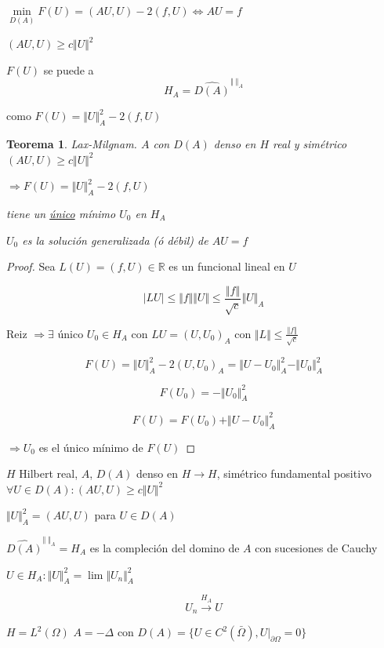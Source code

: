 \documentclass[a4paper,10pt]{book}
\newtheorem{theorem}{Teorema}
\begin{document}
 $\underset{D(A)}{\min} F(U)= (AU,U) -2 (f,U) \Leftrightarrow AU=f$ 

 $(AU,U) \geq c\Vert U\Vert^2$

 $F(U)$ se puede a 
 \[H_A = \widehat{D(A)}^{\Vert \;\Vert_A} \]

como $F(U)= \Vert U \Vert_A^2 -2 (f,U)$

\begin{theorem}
    Lax-Milgnam. $A$ con $D(A)$ denso en $H$ real y simétrico $(AU,U)\geq c \Vert U\Vert^2 $

    $\Rightarrow F(U)= \Vert U\Vert_A^2 -2(f,U)$

    tiene un \underline{único}  mínimo $U_0$ en $H_A$ 

    $U_0$ es la solución generalizada (ó débil) de $AU=f$    
\end{theorem}

\begin{proof}
    Sea $L(U)=(f,U) \in \mathbb{R}$ es un funcional lineal en $U$

    \[
    |LU| \leq \Vert f\Vert \Vert U \Vert \leq \frac{\Vert f\Vert}{\sqrt{c}} \Vert U\Vert_A
    \]

    Reiz $\Rightarrow \exists $ único $U_0\in H_A$ con $LU = (U,U_0)_A $ con $\Vert L\Vert \leq \frac{\Vert f\Vert}{ \sqrt{c}}$

    \[
    F(U) = \Vert U\Vert_A^2 -2(U,U_0)_A = \Vert U-U_0\Vert_A^2 -\Vert U_0\Vert_A^2
    \]

    \[
    F(U_0)=-\Vert U_0\Vert_A^2 
    \]

    \[
    F(U) = F(U_0) + \Vert U-U_0\Vert_A^2
    \]

    $\Rightarrow U_0$ es el único mínimo de $F(U)$
    
\end{proof}

$H$ Hilbert real, $A$, $D(A)$ denso en $H\rightarrow H$, simétrico fundamental positivo $\forall U\in D(A): (AU,U)\geq c\Vert U\Vert^2$

$\Vert U\Vert_A^2 =(AU,U)$ para $U\in D(A) $ 

 $\widehat{D(A)}^{\Vert \;\Vert_A} =H_A$ es la compleción del domino de $A$ con sucesiones de Cauchy

 $U\in H_A : \Vert U \Vert_A^2 = \lim \Vert U_n \Vert_A^2$

 \[
 U_n\overset{H_A}{ \rightarrow} U
 \]

 $H= L^2 (\Omega ) $  $A= -\Delta$ con $D(A)= \{ U\in C^2(\bar{ \Omega}), U|_{\partial \Omega} =0 \}$
\end{document}
